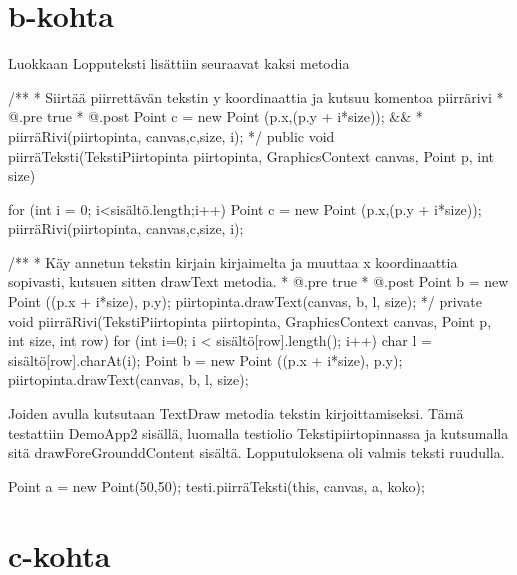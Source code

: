 \section{b-kohta}
\label{b-kohta}
 
Luokkaan Lopputeksti lisättiin seuraavat kaksi metodia
\begin{javacode}
/**
     * Siirtää piirrettävän tekstin y koordinaattia ja kutsuu komentoa piirrärivi
     * @.pre true
     * @.post Point c = new Point (p.x,(p.y + i*size)); &&
     *        piirräRivi(piirtopinta, canvas,c,size, i);
     */
    public void piirräTeksti(TekstiPiirtopinta piirtopinta, GraphicsContext
    canvas, Point p, int size) { for (int i = 0; i<sisältö.length;i++) {
        Point c = new Point (p.x,(p.y + i*size));
        piirräRivi(piirtopinta, canvas,c,size, i);
      }
      
    }
    /**
     * Käy annetun tekstin kirjain kirjaimelta ja muuttaa x koordinaattia sopivasti,
       kutsuen sitten drawText metodia.
     * @.pre true
     * @.post Point b = new Point ((p.x + i*size), p.y);
          piirtopinta.drawText(canvas, b, l, size);
     */
    private void piirräRivi(TekstiPiirtopinta piirtopinta, GraphicsContext
    canvas, Point p, int size, int row) { for (int i=0; i <
    sisältö[row].length(); i++) { char l = sisältö[row].charAt(i); Point b = new
    Point ((p.x + i*size), p.y); piirtopinta.drawText(canvas, b, l, size);
      }
    }
\end{javacode}
Joiden avulla kutsutaan TextDraw metodia tekstin kirjoittamiseksi. Tämä
testattiin DemoApp2 sisällä, luomalla testiolio Tekstipiirtopinnassa ja
kutsumalla sitä drawForeGrounddContent sisältä. Lopputuloksena oli valmis
teksti ruudulla.
\begin{javacode}
Point a = new Point(50,50);
testi.piirräTeksti(this, canvas, a, koko);
\end{javacode}

\section{c-kohta}
\label{c-kohta}

